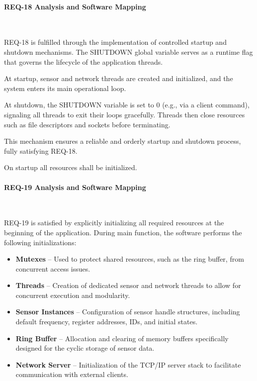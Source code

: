 \documentclass{article}
\begin{document}
\paragraph{REQ-18 Analysis and Software Mapping}\

REQ-18 is fulfilled through the implementation of controlled startup and shutdown 
mechanisms. The SHUTDOWN global variable serves as a runtime flag that governs the 
lifecycle of the application threads.

At startup, sensor and network threads are created and initialized, and the system 
enters its main operational loop.

At shutdown, the SHUTDOWN variable is set to 0 (e.g., via a client command), 
signaling all threads to exit their loops gracefully. Threads then close resources 
such as file descriptors and sockets before terminating.

This mechanism ensures a reliable and orderly startup and shutdown process, fully 
satisfying REQ-18.


\begin{tcolorbox}[
    title=REQ-19,
    colback=gray!5,
    colframe=black,
    fonttitle=\bfseries
]
On startup all resources shall be initialized.
\end{tcolorbox}

\paragraph{REQ-19 Analysis and Software Mapping}\

REQ-19 is satisfied by explicitly initializing all required resources at the 
beginning of the application. During main function, the software performs the following 
initializations:

\begin{itemize}
    \item \textbf{Mutexes} -- Used to protect shared resources, such as the ring buffer, from concurrent access issues.
    \item \textbf{Threads} -- Creation of dedicated sensor and network threads to allow for concurrent execution and modularity.
    \item \textbf{Sensor Instances} -- Configuration of sensor handle structures, including default frequency, register addresses, IDs, and initial states.
    \item \textbf{Ring Buffer} -- Allocation and clearing of memory buffers specifically designed for the cyclic storage of sensor data.
    \item \textbf{Network Server} -- Initialization of the TCP/IP server stack to facilitate communication with external clients.
\end{itemize}
\end{document}
